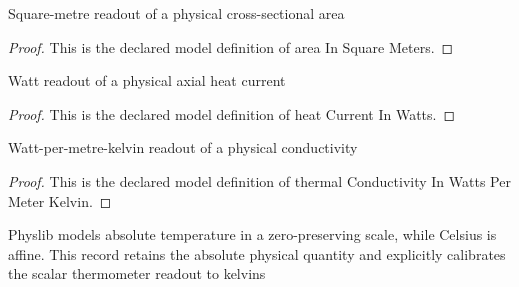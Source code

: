 \begin{definition}
  \label{def:physics:phyx-mini-0488:phyxminiproblems-problemphyxmini0488-areainsquaremeters}
  Square-metre readout of a physical cross-sectional area
\end{definition}
\begin{proof}
  This is the declared model definition of area In Square Meters.
\end{proof}
\begin{definition}
  \label{def:physics:phyx-mini-0488:phyxminiproblems-problemphyxmini0488-heatcurrentinwatts}
  Watt readout of a physical axial heat current
\end{definition}
\begin{proof}
  This is the declared model definition of heat Current In Watts.
\end{proof}
\begin{definition}
  \label{def:physics:phyx-mini-0488:phyxminiproblems-problemphyxmini0488-thermalconductivityinwattspermeterkelvin}
  Watt-per-metre-kelvin readout of a physical conductivity
\end{definition}
\begin{proof}
  This is the declared model definition of thermal Conductivity In Watts Per Meter Kelvin.
\end{proof}
\begin{definition}
  \label{def:physics:phyx-mini-0488:phyxminiproblems-problemphyxmini0488-celsiustemperaturereading}
  Physlib models absolute temperature in a zero-preserving scale, while Celsius is affine. This record retains the absolute physical quantity and explicitly calibrates the scalar thermometer readout to kelvins
\end{definition}
